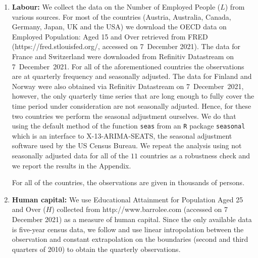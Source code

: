 \documentclass[a4paper,12pt]{article}
\begin{document}
\begin{enumerate}
\item \textbf{Labour:} We collect the data on the Number of Employed People ($L$) from various sources. For most of the countries (Austria, Australia, Canada, Germany, Japan, UK and the USA) we download the OECD data on Employed Population: Aged 15 and Over retrieved from FRED (https://fred.stlouisfed.org/, accessed on 7~December 2021). \nocite{OECDempl} The data for France and Switzerland were downloaded from Refinitiv Datastream on 7~December~2021. For all of the aforementioned countries the observations are at quarterly frequency and seasonally adjusted. The data for Finland and Norway were also obtained via Refinitiv Datastream on 7~December~2021, however, the only quarterly time series that are long enough to fully cover the time period under consideration are not seasonally adjusted. Hence, for these two countries we perform the seasonal adjustment ourselves. We do that using the default method of the function \verb|seas| from an \verb|R| package \verb|seasonal| \citep*{Sax2018} which is an interface to X-13-ARIMA-SEATS, the seasonal adjustment software used by the US Census Bureau. We repeat the analysis using not seasonally adjusted data for all of the $11$ countries as a robustness check and we report the results in the Appendix.

For all of the countries, the observations are given in thousands of persons.
\item \textbf{Human capital:} We use Educational Attainment for Population Aged 25 and Over ($H$) collected from http://www.barrolee.com (accessed on 7 December 2021) as a measure of human capital. Since the only available data is five-year census data, we follow \cite{Zhang2012} and use linear intropolation between the observation and constant extrapolation on the boundaries (second and third quarters of 2010) to obtain the quarterly observations.
\end{enumerate}
\end{document}
